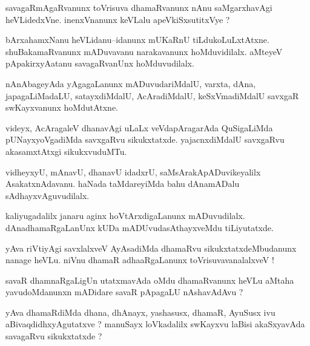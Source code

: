 \documentclass{article}
\begin{document}
\begin{mn}%
savagaRmAgaRvanunx toVrisuva dhamaRvanunx nAnu saMgarxhavAgi heVLidedxVne. inenxVnanunx 
keVLalu apeVkiSxsutitxVye ?
\end{mn}


\begin{mn}%
bArxahamxNanu heVLidanu--idanunx mUKaRnU tiLdukoLuLxtAtxne. shuBakamaRvanunx mADuvavanu 
narakavanunx hoMduvidilalx. aMteyeV pApakirxyAatanu savagaRvanUnx hoMduvudilalx.
\end{mn}

\begin{mn}%
nAnAbageyAda yAgagaLanunx mADuvudariMdalU, varxta, dAna, japagaLiMadaLU, satayxdiMdalU, 
AcAradiMdalU, keSxVmadiMdalU savxgaR swKayxvanunx hoMdutAtxne.
\end{mn}

\begin{mn}%
videyx, AcAragaleV dhanavAgi uLaLx veVdapAragarAda QuSigaLiMda pUNayxyoVgadiMda savxgaRvu 
sikukxtatxde. yajacnxdiMdalU savxgaRvu akasamxtAtxgi sikukxvuduMTu.
\end{mn}

\begin{mn}%
vidheyxyU, mAnavU, dhanavU idadxrU, saMsArakApADuvikeyalilx AsakatxnAdavanu. haNada 
taMdareyiMda bahu dAnamADalu sAdhayxvAguvudilalx.
\end{mn}

\begin{mn}%
kaliyugadalilx janaru aginx hoVtArxdigaLanunx mADuvudilalx. dAnadhamaRgaLanUnx kUDa 
mADUvudasAthayxveMdu tiLiyutatxde.
\end{mn}

\begin{mn}%
yAva riVtiyAgi savxlalxveV AyAsadiMda dhamaRvu sikukxtatxdeMbudanunx nanage heVLu. niVnu 
dhamaR adhaaRgaLanunx toVrisuvavanalalxveV !
\end{mn}

\begin{mn}%
savaR dhamnaRgaLigUn utatxmavAda oMdu dhamaRvanunx heVLu aMtaha yavudoMdanunxn mADidare 
savaR pApagaLU nAshavAdAvu ?
\end{mn}

\begin{mn}%
yAva dhamaRdiMda dhana, dhAnayx, yashasusx, dhamaR, AyuSusx ivu aBivaqdidhxyAgutatxve ? 
manuSayx loVkadalilx swKayxvu laBisi akaSxyavAda savagaRvu sikukxtatxde ?
\end{mn}
\end{document}
